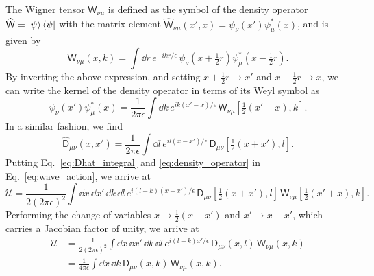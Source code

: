 The Wigner tensor $\mathsf{W}_{\nu\mu}$ is defined as the symbol of the density operator $\widehat{\mathsf{W}} = \mathinner{\lvert{\psi}\rangle}\mathinner{\langle{\psi}\rvert}$ with the matrix element $\widehat{\mathsf{W}}_{\nu\mu}(x',x) = \psi_{\nu}(x')\psi_{\mu}^{*}(x)$, and is given by
%
\begin{equation}
  \mathsf{W}_{\nu\mu}(x, k) = \int \dd{r}\, e^{-ikr/\epsilon}\, \psi_{\nu}\left(x + \tfrac{1}{2}r\right)\psi^{*}_{\mu}\left(x - \tfrac{1}{2}r\right).
\end{equation}
%
By inverting the above expression, and setting $x + \tfrac{1}{2}r \to x'$ and $x- \tfrac{1}{2}r \to x$, we can write the kernel of the density operator in terms of its Weyl symbol as
%
\begin{equation}
  \psi_{\nu}(x') \psi^{*}_{\mu}(x) = \frac{1}{2\pi \epsilon} \int \dd{k}\, e^{ik(x' -x)/\epsilon}\,\mathsf{W}_{\nu\mu}\left[\tfrac{1}{2}(x' + x), k\right].
  \label{eq:density_operator}
\end{equation}
%
In a similar fashion, we find
%
\begin{equation}
  \widehat{\mathsf{D}}_{\mu\nu}(x, x') = \frac{1}{2\pi\epsilon} \int \dd{l}\, e^{il(x -x')/\epsilon}\,\mathsf{D}_{\mu\nu}\left[\tfrac{1}{2}(x + x'), l\right].
  \label{eq:Dhat_integral}
\end{equation}
%
Putting Eq.~\eqref{eq:Dhat_integral} and \eqref{eq:density_operator} in Eq.~\eqref{eq:wave_action}, we arrive at
%
\begin{equation}
  \mathscr{U} = \frac{1}{2(2\pi\epsilon)^{2}}\int \dd{x}\,\dd{x'}\,\dd{k}\,\dd{l}\, e^{i(l-k)(x -x')/\epsilon}\,\mathsf{D}_{\mu\nu}\left[\tfrac{1}{2}(x + x'), l\right]\, \mathsf{W}_{\nu\mu}\left[\tfrac{1}{2}(x' + x), k\right].
\end{equation}
%
Performing the change of variables $x \to \tfrac{1}{2}(x + x')$ and $x' \to x - x'$, which carries a Jacobian factor of unity, we arrive at
%
\begin{equation}
  \begin{aligned}
    \mathscr{U} &= \frac{1}{2(2\pi\epsilon)^{2}}\int \dd{x}\,\dd{x'}\,\dd{k}\,\dd{l}\, e^{i(l-k)x'/\epsilon}\,\mathsf{D}_{\mu\nu}(x, l)\,\mathsf{W}_{\nu\mu}(x, k)\\
                &= \frac{1}{4\pi\epsilon}\int \dd{x}\,\dd{k}\,\mathsf{D}_{\mu\nu}(x, k)\,\mathsf{W}_{\nu\mu}(x,k).
  \end{aligned}
  \label{eq:wave_action_symbol_form}
\end{equation}


